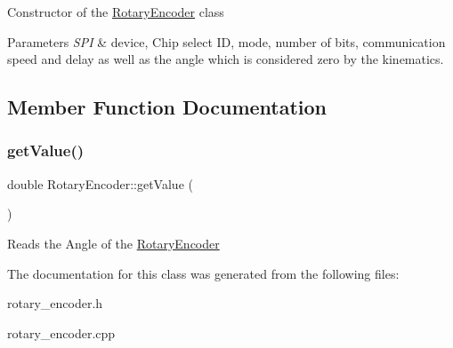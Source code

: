 Constructor of the \hyperlink{classRotaryEncoder}{Rotary\+Encoder} class 
\begin{DoxyParams}{Parameters}
{\em S\+PI} & device, Chip select ID, mode, number of bits, communication speed and delay as well as the angle which is considered zero by the kinematics. \\
\hline
\end{DoxyParams}


\subsection{Member Function Documentation}
\mbox{\label{classRotaryEncoder_adf89df36f38d0ee87b454f22c25a85f0}} 
\subsubsection{\texorpdfstring{get\+Value()}{getValue()}}
{\footnotesize\ttfamily double Rotary\+Encoder\+::get\+Value (\begin{DoxyParamCaption}{ }\end{DoxyParamCaption})}

Reads the Angle of the \hyperlink{classRotaryEncoder}{Rotary\+Encoder} 

The documentation for this class was generated from the following files\+:\begin{DoxyCompactItemize}
\item 
rotary\+\_\+encoder.\+h\item 
rotary\+\_\+encoder.\+cpp\end{DoxyCompactItemize}
